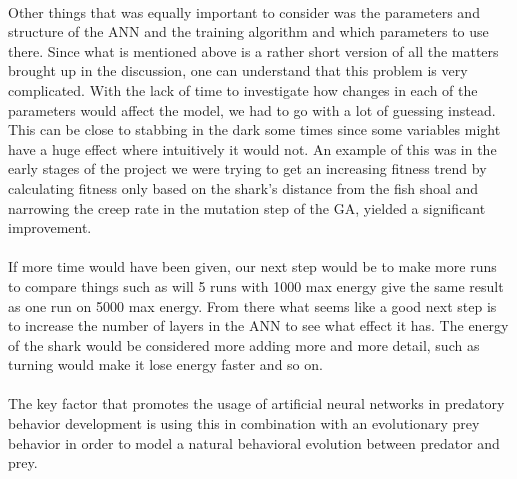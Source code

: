 \\
Other things that was equally important to consider was the parameters and structure of the ANN and the training algorithm and which parameters to use there. Since what is mentioned above is a rather short version of all the matters brought up in the discussion, one can understand that this problem is very complicated. With the lack of time to investigate how changes in each of the parameters would affect the model, we had to go with a lot of guessing instead. This can be close to stabbing in the dark some times since some variables might have a huge effect where intuitively it would not. An example of this was in the early stages of the project we were trying to get an increasing fitness trend by calculating fitness only based on the shark's distance from the fish shoal and narrowing the creep rate in the mutation step of the GA, yielded a significant improvement.\\
\\
If more time would have been given, our next step would be to make more runs to compare things such as will 5 runs with 1000 max energy give the same result as one run on 5000 max energy. From there what seems like a good next step is to increase the number of layers in the ANN to see what effect it has. The energy of the shark would be considered more adding more and more detail, such as turning would make it lose energy faster and so on.\\
\\
The key factor that promotes the usage of artificial neural networks in
predatory behavior development is using this in combination with an
evolutionary prey behavior in order to model a natural behavioral evolution
between predator and prey.
